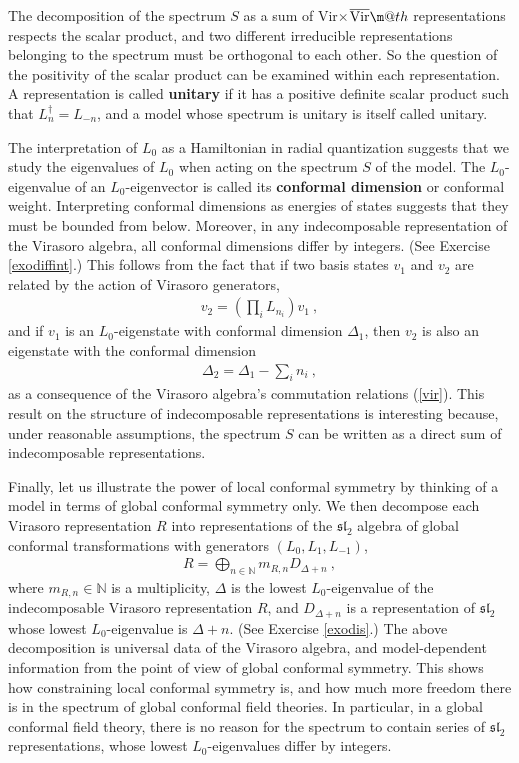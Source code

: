 \documentclass[12pt,a4paper,notitlepage]{report}
\makeatletter
\newcommand*{\textoverline}[1]{$\overline{\hbox{#1}}\m@th$}
\newcommand \N {\mathbb{N}}
\numberwithin{equation}{section}
\newcommand{\term}[1]{\textbf{\boldmath #1}\index{#1}}
\theoremstyle{break}
\makeatother
\begin{document}
The decomposition of the spectrum $S$ as a sum of Vir$\times$\textoverline{Vir} representations respects the scalar product, and two different irreducible representations belonging to the spectrum must be orthogonal to each other.
So the question of the positivity of the scalar product can be examined within each representation.
A representation is called \term{unitary} if it has a positive definite scalar product such that 
$L^\dagger_n = L_{-n}$, and a model whose spectrum is unitary is itself called unitary. 

The interpretation of $L_0$ as a Hamiltonian in radial quantization suggests that we study the eigenvalues of $L_0$ when acting on the spectrum  $S$ of the model.
The $L_0$-eigenvalue of an $L_0$-eigenvector is called its \term{conformal dimension} or conformal weight. 
Interpreting conformal dimensions as energies of states suggests that they
must be bounded from below.
Moreover, in any indecomposable representation of the Virasoro algebra, all conformal dimensions differ by integers. (See Exercise \ref{exodiffint}.) This follows from the fact that if 
two basis states $v_1$ and $v_2$ are related by the action of Virasoro generators,
\begin{align}
 v_2 = \left(\prod_i L_{n_i}\right) v_1\ ,
\label{vovt}
\end{align}
and if $v_1$ is an $L_0$-eigenstate with conformal dimension $\Delta_1$, then $v_2$ is also an eigenstate with the conformal dimension
\begin{align}
 \Delta_2 = \Delta_1 - \sum_i n_i\ ,
\label{ddsn}
\end{align}
as a consequence of the Virasoro algebra's commutation relations (\ref{vir}).
This result on the structure of indecomposable representations is interesting because, under reasonable assumptions, the spectrum $S$ can be written as a direct sum of indecomposable representations.

Finally, let us illustrate the power of local conformal symmetry by thinking of a model in terms of global conformal symmetry only. 
We then decompose each Virasoro representation $R$ into representations of the $\mathfrak{sl}_2$ algebra of global conformal transformations with generators $(L_0,L_1,L_{-1})$,
\begin{align}
 R=\bigoplus_{n\in\N} m_{R,n} D_{\Delta+n}\ ,
\label{rbd}
\end{align}
where $m_{R,n}\in \N$ is a multiplicity, $\Delta$ is the lowest $L_0$-eigenvalue of the indecomposable Virasoro representation $R$, and $D_{\Delta+n}$ is a representation of $\mathfrak{sl}_2$ whose lowest $L_0$-eigenvalue is $\Delta+n$.
(See Exercise \ref{exodis}.)
The above decomposition is universal data of the Virasoro algebra, and 
model-dependent information from the point of view of global conformal symmetry.
This shows how constraining local conformal symmetry is, and how much more freedom there is in the spectrum of global conformal field theories.
In particular, in a global conformal field theory, there is no reason for the spectrum to contain series of
$\mathfrak{sl}_2$ representations, whose lowest $L_0$-eigenvalues differ by integers. 
\end{document}
